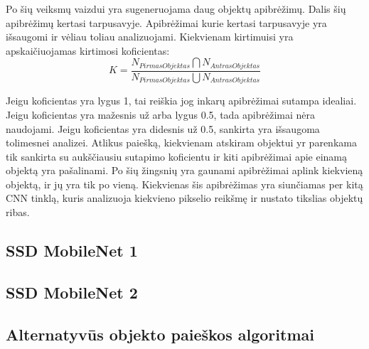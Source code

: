 \documentclass{VUMIFInfKursinis}
\begin{document}
Po šių veiksmų vaizdui yra sugeneruojama daug objektų apibrėžimų. Dalis šių apibrėžimų
kertasi tarpusavyje. Apibrėžimai kurie kertasi tarpusavyje yra išsaugomi ir vėliau
toliau analizuojami. Kiekvienam kirtimuisi yra apskaičiuojamas kirtimosi koficientas:
\[
  K = \frac{N_{PirmasObjektas} \bigcap N_{AntrasObjektas}}{N_{PirmasObjektas} \bigcup N_{AntrasObjektas}}
\]
\par
Jeigu koficientas yra lygus 1, tai reiškia jog inkarų apibrėžimai sutampa idealiai.
Jeigu koficientas yra mažesnis už arba lygus 0.5, tada apibrėžimai nėra naudojami.
Jeigu koficientas yra didesnis už 0.5, sankirta yra išsaugoma tolimesnei analizei.
Atlikus paiešką, kiekvienam atskiram objektui yr parenkama tik sankirta su aukščiausiu
sutapimo koficientu ir kiti apibrėžimai apie einamą objektą yra pašalinami.
Po šių žingsnių yra gaunami apibrėžimai aplink kiekvieną objektą, ir jų yra tik po
vieną. Kiekvienas šis apibrėžimas yra siunčiamas per kitą CNN tinklą, kuris analizuoja
kiekvieno pikselio reikšmę ir nustato tikslias objektų ribas.











\subsection{SSD MobileNet 1}
\par









\subsection{SSD MobileNet 2}
\par





\subsection{Alternatyvūs objekto paieškos algoritmai}
\par
\end{document}
